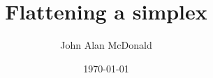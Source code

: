 \documentclass[11pt,fleqn]{article}
\begin{document}


\pagestyle{myheadings}

\title{Flattening a simplex}
\author{ \sc John Alan McDonald }

\date{\today}

\maketitle

\nocite{goodman-orourke-2004}



{\small


}
\end{document}
